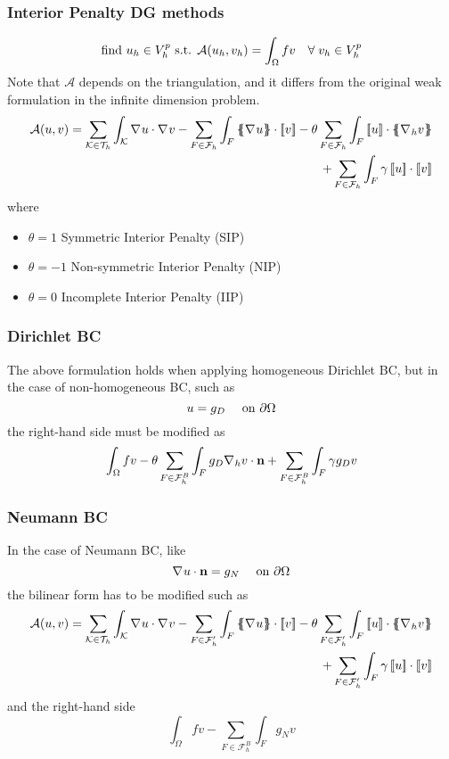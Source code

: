\subsubsection*{Interior Penalty DG methods}
\[
    \text{find } u_h \in V_h^p \text{ s.t. } \mathcal{A}(u_h, v_h) = \int_\Omega fv \quad \forall \;v_h \in V_h^p
\]
Note that \(\mathcal{A}\) depends on the triangulation, and it differs from the original weak formulation in the infinite dimension problem.
\begin{equation*}
    \begin{split}
        \mathcal{A}(u, v) =  \sum_{\element \in \triangulation} \int_\element \grad u \cdot \grad v  - \sum_{F \in \mathcal{F}_h} \int_F \average{\grad u} \cdot \jump{v}  - \theta \sum_{F \in \mathcal{F}_h} \int_F \jump{u} \cdot \average{\grad_h v} \\+ \sum_{F \in \mathcal{F}_h} \int_F \gamma \jump{u} \cdot \jump{v}
    \end{split}
\end{equation*}
where 
\begin{itemize}
    \item \(\theta =  1\) Symmetric Interior Penalty (SIP)
    \item \(\theta =  -1\) Non-symmetric Interior Penalty (NIP)
    \item \(\theta =  0\) Incomplete Interior Penalty (IIP)
\end{itemize}
\subsubsection*{Dirichlet BC}
The above formulation holds when applying homogeneous Dirichlet BC, but in the case of non-homogeneous BC, such as 
\[
    u = g_D \quad \text{ on } \partial\Omega
\]
the right-hand side must be modified as
\[
    \int_\Omega fv -\theta \sum_{F \in \mathcal{F}^B_h}\int_F g_D \nabla\mspace{1mu}_h v \cdot \textbf{n} + \sum_{F \in \mathcal{F}^B_h} \int_F \gamma g_D v 
\]
\subsubsection*{Neumann BC}
In the case of Neumann BC, like 
\[
    \nabla\mspace{1mu} u \cdot \textbf{n} = g_N \quad \text{ on } \partial\Omega
\]
the bilinear form has to be modified such as 
\begin{equation*}
    \begin{split}
        \mathcal{A}(u, v) =  \sum_{\element \in \triangulation} \int_\element \grad u \cdot \grad v  - \sum_{F \in \mathcal{F}'_h} \int_F \average{\grad u} \cdot \jump{v}  - \theta \sum_{F \in \mathcal{F}'_h} \int_F \jump{u} \cdot \average{\grad_h v} \\+ \sum_{F \in \mathcal{F}'_h} \int_F \gamma \jump{u} \cdot \jump{v}
    \end{split}
\end{equation*}
and the right-hand side 
\[
    \int_\Omega fv - \sum_{F \in \mathcal{F}^B_h}\int_F g_N v
\]
